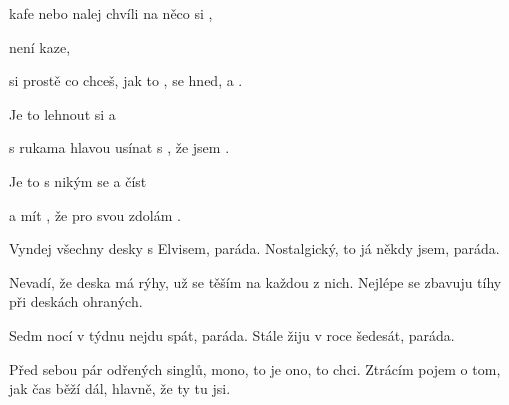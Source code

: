 
  \zs

 kafe nebo nalej   
 chvíli na něco si ,  

  není  
  kaze, 

 si prostě  co chceš,  jak to ,
 se hned, a . 

\ks
\zr

Je to  lehnout si  a 

s rukama  hlavou usínat s , že jsem . 

Je to  s nikým se  a číst 
 
a mít , že pro svou  zdolám . 

\kr
\zs

Vyndej všechny desky s Elvisem, paráda. 
Nostalgický, to já někdy jsem, paráda.

Nevadí, že deska má rýhy, už se těším na každou z nich. 
Nejlépe se zbavuju tíhy 
při deskách ohraných. 

\ks
\zr    \kr
\zs

Sedm nocí v týdnu nejdu spát, paráda. 
Stále žiju v roce šedesát, paráda. 

Před sebou pár odřených singlů, mono, to je ono, to chci. 
Ztrácím pojem o tom, jak čas běží dál, hlavně, že ty tu jsi. 

\ks
\zr \kr

\kp
